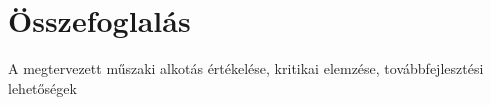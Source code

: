 \chapter{Összefoglalás}

A megtervezett műszaki alkotás értékelése, kritikai elemzése, továbbfejlesztési lehetőségek